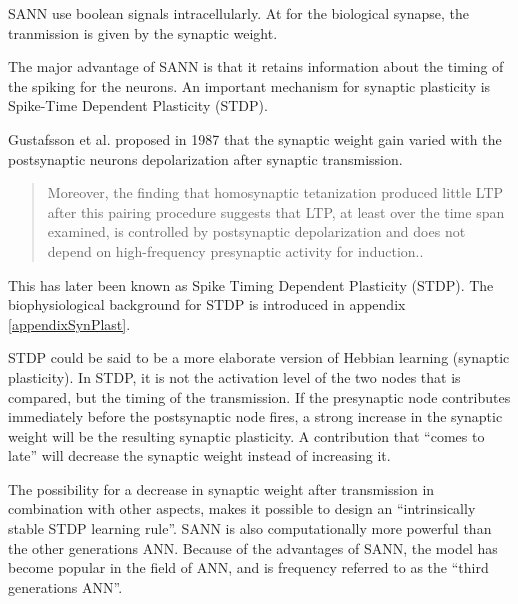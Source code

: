 SANN use boolean signals intracellularly. 
At for the biological synapse, the tranmission is given by the synaptic weight. 

The major advantage of SANN is that it retains information about the timing of the spiking for the neurons.  %
An important mechanism for synaptic plasticity is Spike-Time Dependent Plasticity (STDP).

Gustafsson et al. proposed in 1987 that the synaptic weight gain varied with the postsynaptic neurons depolarization after synaptic transmission\cite{Gustafsson03011987}. 
\begin{quote}
Moreover, the finding that homosynaptic tetanization produced little LTP after this pairing procedure suggests that LTP, at least over the time span examined, is controlled by postsynaptic depolarization and does not depend on high-frequency presynaptic activity for induction.\cite{Gustafsson03011987}.
\end{quote}
This has later been known as Spike Timing Dependent Plasticity (STDP)\cite{reviewSTDP}. 
The biophysiological background for STDP is introduced in appendix \ref{appendixSynPlast}.

STDP could be said to be a more elaborate version of Hebbian learning (synaptic plasticity). 
In STDP, it is not the activation level of the two nodes that is compared, but the timing of the transmission.
If the presynaptic node contributes immediately before the postsynaptic node fires, a strong increase in the synaptic weight will be the resulting synaptic plasticity.
A contribution that ``comes to late'' will decrease the synaptic weight instead of increasing it\cite{reviewSTDP}.



The possibility for a decrease in synaptic weight after transmission in combination with other aspects, makes it possible to design an ``intrinsically stable STDP learning rule''\cite{StableHebbianLearningFromSTDP}.
SANN is also computationally more powerful than the other generations ANN\cite{florian03}.
Because of the advantages of SANN, the model has become popular in the field of ANN, and is frequency referred to as the ``third generations ANN''.







